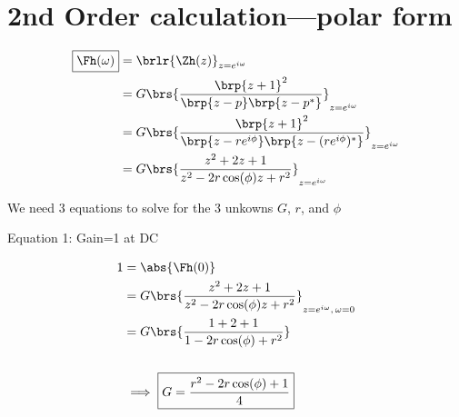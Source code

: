 \section{2nd Order  calculation---polar form}
\begin{align*}
  \boxed{\Fh(\omega)}
    &= \brlr{\Zh(z)}_{z=e^{i\omega}}
  \\&= G\brs{\frac{\brp{z+1}^2}
                  {\brp{z-p}\brp{z-p^\ast}}}_{z=e^{i\omega}}
  \\&= G\brs{\frac{\brp{z+1}^2}
                  {\brp{z-re^{i\phi}}\brp{z-(re^{i\phi})^\ast}}}_{z=e^{i\omega}}
  \\&= G\brs{\frac{z^2 + 2z + 1}
                  {z^2 - 2r\cos(\phi)z + r^2}
            }_{z=e^{i\omega}}
\end{align*}

We need 3 equations to solve for the 3 unkowns $G$, $r$, and $\phi$


Equation 1: Gain=1 at DC

\begin{align*}
  1 &= \abs{\Fh(0)}
  \\&= G\brs{\frac{z^2 + 2z            + 1}
                  {z^2 - 2r\cos(\phi)z + r^2}}_{z=e^{i\omega},\,\omega=0}
  \\&= G\brs{\frac{1   + 2             + 1}
                  {1   - 2r\cos(\phi)  + r^2}}
  \\
  \\&\implies \boxed{G = \frac{r^2 - 2r\cos(\phi) + 1}{4}}
\end{align*}



